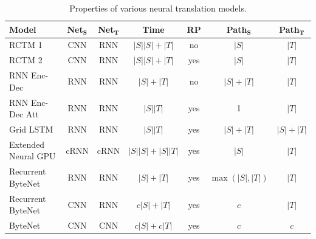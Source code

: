 \documentclass{article}
\begin{document}
\begin{table}
\small
    \centering
    \bgroup
    \def\arraystretch{1.5}%
    \begin{tabular}{l c  c c c c c}
    
        \toprule
        
       \textbf{Model}  & \textbf{Net$_\mathbf{S}$} & \textbf{Net$_\mathbf{T}$} & \textbf{Time} & \textbf{RP} & \textbf{Path$_\mathbf{S}$} & \textbf{Path$_\mathbf{T}$} \\
        \hline
        \multicolumn{1}{l}{RCTM 1 } & CNN & RNN & $|S||S|+|T|$ & no & $|S|$  & $|T|$  \\ 
        \multicolumn{1}{l}{RCTM 2 } & CNN & RNN & $|S||S| + |T|$ & yes & $|S|$  & $|T|$ \\
        \multicolumn{1}{l}{RNN Enc-Dec } & RNN & RNN & $|S| + |T|$ & no & $|S|+|T|$ & $|T|$  \\
        \multicolumn{1}{l}{RNN Enc-Dec Att  } & RNN & RNN & $|S||T|$ &
         yes & 1 &  $|T|$ \\
        \multicolumn{1}{l}{Grid LSTM } & RNN & RNN & $|S||T|$ &
        yes & $|S| + |T|$ & $|S|+|T|$ \\ %
        \multicolumn{1}{l}{Extended Neural GPU } & cRNN & cRNN & $|S||S| + |S||T|$ &
        yes & $|S|$ & $|T|$  \\ \hline
        \multicolumn{1}{l}{Recurrent ByteNet} & RNN & RNN & $|S|+|T|$ & yes
         & $\max(|S|,|T|)$ & $|T|$  \\
        \multicolumn{1}{l}{Recurrent ByteNet} & CNN & RNN & $c|S|+|T|$ &
        yes & $c$ & $|T|$  \\
        \multicolumn{1}{l}{ByteNet} & CNN & CNN & $c|S|+c|T|$ &
        yes & $c$ & $c$ \\ \bottomrule
    \end{tabular}
    \egroup
    \caption{ Properties of various neural translation models.}
\label{properties}
\end{table}
\end{document}
